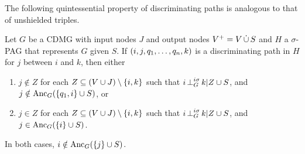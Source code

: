 The following quintessential property of discriminating paths is analogous to that of unshielded triples. 
\begin{Prp}\label{prp:orienting_discriminating_paths}
  Let $G$ be a CDMG with input nodes $J$ and output nodes $V^+ = V \,\dot{\cup}\, S$ and $H$ a $\sigma$-PAG that represents $G$ given $S$.
  If $\left ( i, j, q_1, \dots, q_n, k \right )$ is a discriminating path in $H$ for $j$ between $i$ and $k$, then
  either 
  \begin{enumerate}[label=(\roman*)]
    \item $j \notin Z$ for each $Z \subseteq (V \cup J) \setminus \{i,k\}$ such that $i \operatorname*{\perp}^{i\sigma}_G k | Z \cup S$, and $j \notin \mathrm{Anc}_G(\{q_1,i\} \cup S)$, or
    \item $j \in Z$ for each $Z \subseteq (V \cup J) \setminus \{i,k\}$ such that $i \operatorname*{\perp}^{i\sigma}_G k | Z \cup S$, and $j \in \mathrm{Anc}_G(\{i\} \cup S)$.
  \end{enumerate}
  In both cases, $i \notin \mathrm{Anc}_G(\{j\} \cup S)$.
\end{Prp}
